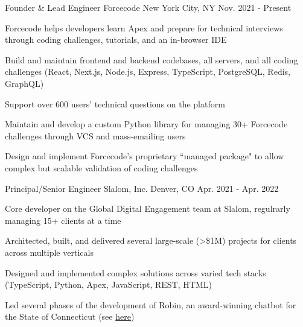 \begin{cventries}
  \cventry
    {Founder \& Lead Engineer} %
    {Forcecode} %
    {New York City, NY} %
    {Nov. 2021 - Present} %
    {
      \begin{cvitems} %
        \item {Forcecode helps developers learn Apex and prepare for technical interviews through coding challenges, tutorials, and an in-browser IDE}
        \item {Build and maintain frontend and backend codebases, all servers, and all coding challenges (React, Next.js, Node.js, Express, TypeScript, PostgreSQL, Redis, GraphQL)}
        \item {Support over 600 users' technical questions on the platform}
        \item {Maintain and develop a custom Python library for managing 30+ Forcecode challenges through VCS and mass-emailing users}
        \item {Design and implement Forcecode's proprietary ``managed package" to allow complex but scalable validation of coding challenges}
      \end{cvitems}
    }


  \cventry
    {Principal/Senior Engineer} %
    {Slalom, Inc.} %
    {Denver, CO} %
    {Apr. 2021 - Apr. 2022} %
    {
      \begin{cvitems} %
        \item {Core developer on the Global Digital Engagement team at Slalom, regulrarly managing 15+ clients at a time}
        \item {Architected, built, and delivered several large-scale (>\$1M) projects for clients across multiple verticals}
        \item {Designed and implemented complex solutions across varied tech stacks (TypeScript, Python, Apex, JavaScript, REST, HTML)}
        \item {Led several phases of the development of Robin, an award-winning chatbot for the State of Connecticut (see \href{https://portal.ct.gov/das/dasblog/das-team-wins-government-experience-award}{\color{awesome-skyblue}here})}
      \end{cvitems}
    }


\end{cventries}
